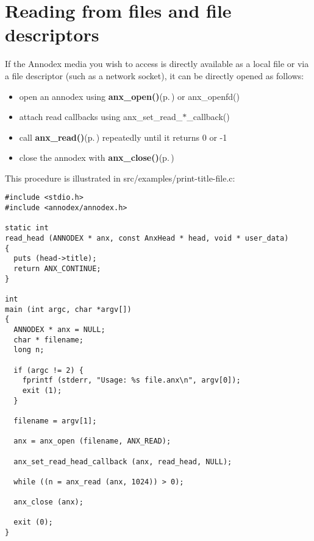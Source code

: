 \section{Reading from files and file descriptors}
\label{group__reading__files}
If the Annodex media you wish to access is directly available as a local file or via a file descriptor (such as a network socket), it can be directly opened as follows:

\begin{itemize}
\item open an annodex using {\bf anx\_\-open()}{\rm (p.\,\pageref{anx__general_8h_a3})} or anx\_\-openfd()\item attach read callbacks using anx\_\-set\_\-read\_\-$\ast$\_\-callback()\item call {\bf anx\_\-read()}{\rm (p.\,\pageref{anx__read_8h_a16})} repeatedly until it returns 0 or -1\item close the annodex with {\bf anx\_\-close()}{\rm (p.\,\pageref{anx__general_8h_a7})}\end{itemize}


This procedure is illustrated in src/examples/print-title-file.c:



\footnotesize\begin{verbatim}
#include <stdio.h>
#include <annodex/annodex.h>

static int
read_head (ANNODEX * anx, const AnxHead * head, void * user_data)
{
  puts (head->title);
  return ANX_CONTINUE;
}

int
main (int argc, char *argv[])
{
  ANNODEX * anx = NULL;
  char * filename;
  long n;

  if (argc != 2) {
    fprintf (stderr, "Usage: %s file.anx\n", argv[0]);
    exit (1);
  }

  filename = argv[1];

  anx = anx_open (filename, ANX_READ);

  anx_set_read_head_callback (anx, read_head, NULL);

  while ((n = anx_read (anx, 1024)) > 0);

  anx_close (anx);

  exit (0);
}
\end{verbatim}
\normalsize
 

